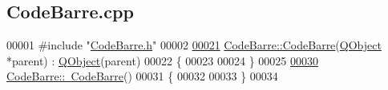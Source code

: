 \hypertarget{_code_barre_8cpp_source}{}\subsection{Code\+Barre.\+cpp}
\label{_code_barre_8cpp_source}

\begin{DoxyCode}
00001 \textcolor{preprocessor}{#include "\hyperlink{_code_barre_8h}{CodeBarre.h}"}
00002 
\hyperlink{class_code_barre_a8134bef083f6fa0e01c848d5edd83754}{00021} \hyperlink{class_code_barre_a8134bef083f6fa0e01c848d5edd83754}{CodeBarre::CodeBarre}(\hyperlink{class_q_object}{QObject} *parent) : \hyperlink{class_q_object}{QObject}(parent)
00022 \{
00023 
00024 \}
00025 
\hyperlink{class_code_barre_a5bb3df2e5c7fba829f0274da4c359f6c}{00030} \hyperlink{class_code_barre_a5bb3df2e5c7fba829f0274da4c359f6c}{CodeBarre::~CodeBarre}()
00031 \{
00032 
00033 \}
00034 
\end{DoxyCode}
